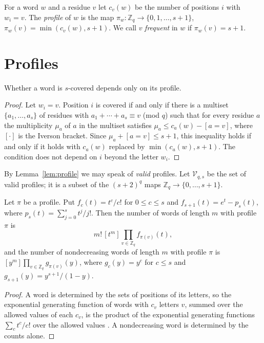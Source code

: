 \documentclass[12pt,reqno]{article}
\newcommand{\Zq}{\mathbb{Z}_q}
\begin{document}
For a word $w$ and a residue $v$ let $c_v(w)$ be the number of positions $i$
with $w_i = v$. The \emph{profile} of $w$ is the map
$\pi_w \colon \Zq \to \{0, 1, \ldots, s+1\}$,
$\pi_w(v) = \min(c_v(w), s+1)$. We call $v$ \emph{frequent} in $w$ if
$\pi_w(v) = s+1$.

\section{Profiles}\label{sec:profiles}

\begin{lemma}\label{lem:profile}
Whether a word is $s$-covered depends only on its profile.
\end{lemma}

\begin{proof}
Let $w_i = v$. Position $i$ is covered if and only if there is a multiset
$\{a_1, \ldots, a_s\}$ of residues with $a_1 + \cdots + a_s \equiv v$ (mod $q$)
such that for every residue $a$ the multiplicity $\mu_a$ of $a$ in the multiset
satisfies $\mu_a \le c_a(w) - [a = v]$, where $[\cdot]$ is the Iverson
bracket. Since $\mu_a + [a = v] \le s+1$, this inequality holds if and only if
it holds with $c_a(w)$ replaced by $\min(c_a(w), s+1)$. The condition does not
depend on $i$ beyond the letter $w_i$.
\end{proof}

By Lemma~\ref{lem:profile} we may speak of \emph{valid} profiles. Let
$\mathcal{V}_{q,s}$ be the set of valid profiles; it is a subset of the
$(s+2)^q$ maps $\Zq \to \{0, \ldots, s+1\}$.

\begin{lemma}\label{lem:count}
Let $\pi$ be a profile. Put $f_c(t) = t^c/c!$ for $0 \le c \le s$ and
$f_{s+1}(t) = e^t - p_s(t)$, where $p_s(t) = \sum_{j=0}^{s} t^j/j!$. Then the
number of words of length $m$ with profile $\pi$ is
\[
m!\,[t^m] \prod_{v \in \Zq} f_{\pi(v)}(t),
\]
and the number of nondecreasing words of length $m$ with profile $\pi$ is
$[y^m] \prod_{v \in \Zq} g_{\pi(v)}(y)$, where $g_c(y) = y^c$ for $c \le s$ and
$g_{s+1}(y) = y^{s+1}/(1-y)$.
\end{lemma}

\begin{proof}
A word is determined by the sets of positions of its letters, so the
exponential generating function of words with $c_v$ letters $v$, summed over
the allowed values of each $c_v$, is the product of the exponential generating
functions $\sum_c t^c/c!$ over the allowed values \cite[Ch.~II]{fs}. A
nondecreasing word is determined by the counts alone.
\end{proof}
\end{document}
